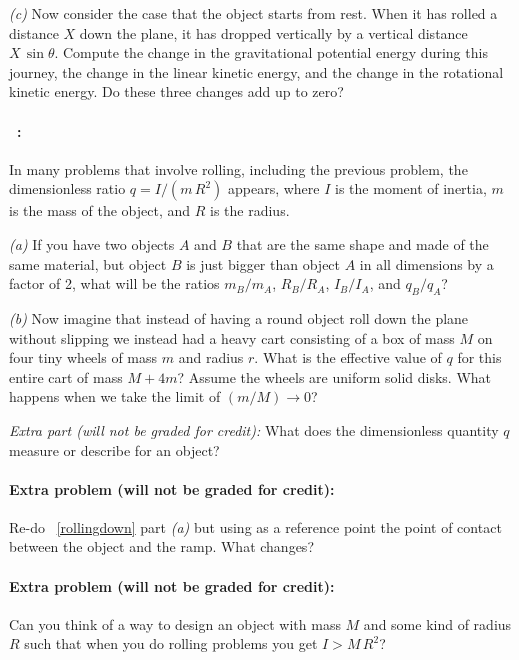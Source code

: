 \documentclass[12pt]{article}
\begin{document}
\textsl{(c)}
Now consider the case that the object starts from rest.  When it has
rolled a distance $X$ down the plane, it has dropped vertically by a
vertical distance $X\,\sin\theta$.  Compute the change in the
gravitational potential energy during this journey, the change in the linear
kinetic energy, and the change in the rotational kinetic energy. Do
these three changes add up to zero?

\paragraph{\problemname~\theproblem:}%
In many problems that involve rolling, including the previous problem,
the dimensionless ratio $q=I / (m\,R^2)$ appears, where $I$ is the moment
of inertia, $m$ is the mass of the object, and $R$ is the radius.

\textsl{(a)} If you have two objects $A$ and $B$ that are the same
shape and made of the same material, but object $B$ is just bigger
than object $A$ in all dimensions by a factor of 2, what will be the
ratios $m_B/m_A$, $R_B/R_A$, $I_B/I_A$, and $q_B/q_A$?

\textsl{(b)} Now imagine that instead of having a round object roll
down the plane without slipping we instead had a heavy cart consisting
of a box of mass $M$ on four tiny wheels of mass $m$ and radius
$r$. What is the effective value of $q$ for this entire cart of mass
$M+4m$? Assume the wheels are uniform solid disks. What happens when
we take the limit of $(m/M)\rightarrow 0$?

\textsl{Extra part (will not be graded for credit):}
What does the dimensionless quantity $q$ measure or describe for an object?

\paragraph{Extra problem (will not be graded for credit):}%
Re-do \problemname~\ref{rollingdown} part \textsl{(a)} but using as a
reference point the point of contact between the object and the ramp.
What changes?

\paragraph{Extra problem (will not be graded for credit):}%
Can you think of a way to design an object with mass $M$ and some kind of radius $R$
such that when you do rolling problems you get $I > M\,R^2$?
\end{document}
